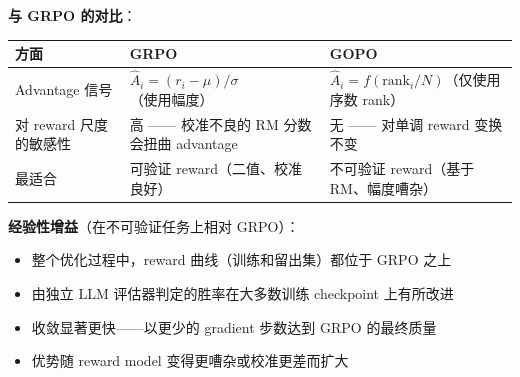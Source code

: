 \textbf{与 GRPO 的对比}：

\noindent\begin{tabularx}{\linewidth}{@{}Z{0.55} Z{1.2} Z{1.25}@{}}
\toprule
\textbf{方面} & \textbf{GRPO} & \textbf{GOPO} \\
\midrule
Advantage 信号 & $\hat{A}_i = (r_i - \mu)/\sigma$（使用幅度） & $\hat{A}_i = f(\text{rank}_i / N)$（仅使用序数 rank） \\
对 reward 尺度的敏感性 & 高 —— 校准不良的 RM 分数会扭曲 advantage & 无 —— 对单调 reward 变换不变 \\
最适合 & 可验证 reward（二值、校准良好） & 不可验证 reward（基于 RM、幅度嘈杂） \\
\bottomrule
\end{tabularx}

\textbf{经验性增益}（在不可验证任务上相对 GRPO）：

\begin{itemize}
  \item 整个优化过程中，reward 曲线（训练和留出集）都位于 GRPO 之上
  \item 由独立 LLM 评估器判定的胜率在大多数训练 checkpoint 上有所改进
  \item 收敛显著更快——以更少的 gradient 步数达到 GRPO 的最终质量
  \item 优势随 reward model 变得更嘈杂或校准更差而扩大
\end{itemize}

